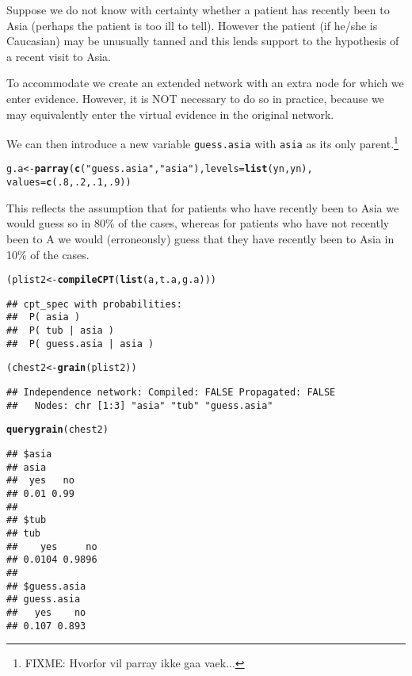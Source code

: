 \documentclass[10pt]{article}\usepackage[]{graphicx}\usepackage[]{color}
\makeatletter
\newcommand{\hlnum}[1]{\textcolor[rgb]{0.686,0.059,0.569}{#1}}%
\newcommand{\hlstr}[1]{\textcolor[rgb]{0.192,0.494,0.8}{#1}}%
\newcommand{\hlstd}[1]{\textcolor[rgb]{0.345,0.345,0.345}{#1}}%
\newcommand{\hlkwb}[1]{\textcolor[rgb]{0.69,0.353,0.396}{#1}}%
\newcommand{\hlkwc}[1]{\textcolor[rgb]{0.333,0.667,0.333}{#1}}%
\newcommand{\hlkwd}[1]{\textcolor[rgb]{0.737,0.353,0.396}{\textbf{#1}}}%
\newenvironment{kframe}{%
 \def\at@end@of@kframe{}%
 \ifinner\ifhmode%
  \def\at@end@of@kframe{\end{minipage}}%
  \begin{minipage}{\columnwidth}%
 \fi\fi%
 \def\FrameCommand##1{\hskip\@totalleftmargin \hskip-\fboxsep
 \colorbox{shadecolor}{##1}\hskip-\fboxsep
     \hskip-\linewidth \hskip-\@totalleftmargin \hskip\columnwidth}%
 \MakeFramed {\advance\hsize-\width
   \@totalleftmargin\z@ \linewidth\hsize
   \@setminipage}}%
 {\par\unskip\endMakeFramed%
 \at@end@of@kframe}
\newenvironment{knitrout}{}{} %
\def\code#1{{\texttt{#1}}}
\makeatother
\begin{document}
Suppose we do not know with certainty whether a patient has
recently been to Asia (perhaps the patient is too ill to
tell). However the patient (if he/she is Caucasian) may be unusually
tanned and this lends support to the hypothesis of a recent visit to
Asia.

To accommodate we create an extended network with an extra
node for which we enter evidence.  However, it is NOT necessary to do
so in practice, because we may equivalently enter the virtual evidence
in the original network.

We can then introduce a new variable
\code{guess.asia} with \code{asia} as its only parent.\footnote{FIXME: Hvorfor vil parray ikke gaa vaek...}

\begin{knitrout}
\color{fgcolor}\begin{kframe}
\begin{alltt}
\hlstd{g.a} \hlkwb{<-} \hlkwd{parray}\hlstd{(}\hlkwd{c}\hlstd{(}\hlstr{"guess.asia"}\hlstd{,} \hlstr{"asia"}\hlstd{),} \hlkwc{levels}\hlstd{=}\hlkwd{list}\hlstd{(yn, yn),}
              \hlkwc{values}\hlstd{=}\hlkwd{c}\hlstd{(}\hlnum{.8}\hlstd{,}\hlnum{.2}\hlstd{,} \hlnum{.1}\hlstd{,}\hlnum{.9}\hlstd{))}
\end{alltt}
\end{kframe}
\end{knitrout}

This reflects the assumption that for patients who have recently been
to Asia we would guess so in 80\% of the cases, whereas for patients who have
not recently been to A we would (erroneously) guess that they have
recently been to Asia in 10\% of the cases.

\begin{knitrout}
\color{fgcolor}\begin{kframe}
\begin{alltt}
\hlstd{(plist2} \hlkwb{<-} \hlkwd{compileCPT}\hlstd{(}\hlkwd{list}\hlstd{(a, t.a, g.a )))}
\end{alltt}
\begin{verbatim}
## cpt_spec with probabilities:
##  P( asia )
##  P( tub | asia )
##  P( guess.asia | asia )
\end{verbatim}
\begin{alltt}
\hlstd{(chest2} \hlkwb{<-} \hlkwd{grain}\hlstd{(plist2))}
\end{alltt}
\begin{verbatim}
## Independence network: Compiled: FALSE Propagated: FALSE 
##   Nodes: chr [1:3] "asia" "tub" "guess.asia"
\end{verbatim}
\begin{alltt}
\hlkwd{querygrain}\hlstd{( chest2 )}
\end{alltt}
\begin{verbatim}
## $asia
## asia
##  yes   no 
## 0.01 0.99 
## 
## $tub
## tub
##    yes     no 
## 0.0104 0.9896 
## 
## $guess.asia
## guess.asia
##   yes    no 
## 0.107 0.893
\end{verbatim}
\end{kframe}
\end{knitrout}
\end{document}
